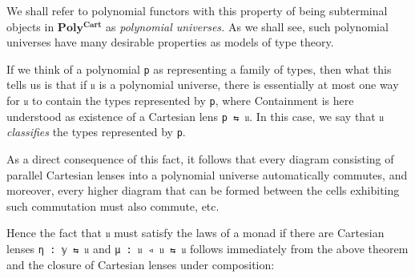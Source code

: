 \documentclass[
  11pt,
  oneside,
  article]{memoir}
\theoremstyle{definition}
\theoremstyle{plain}
\newcommand{\0}{\textsf{0}}
\newcommand{\1}{\tn{\textsf{1}}}
\begin{document}
We shall refer to polynomial functors with this property of being
subterminal objects in \(\mathbf{Poly^{Cart}}\) as \emph{polynomial
universes.} As we shall see, such polynomial universes have many
desirable properties as models of type theory.

If we think of a polynomial \texttt{p} as representing a family of
types, then what this tells us is that if \texttt{𝔲} is a polynomial
universe, there is essentially at most one way for \texttt{𝔲} to contain
the types represented by \texttt{p}, where Containment is here
understood as existence of a Cartesian lens \texttt{p\ ⇆\ 𝔲}. In this
case, we say that \texttt{𝔲} \emph{classifies} the types represented by
\texttt{p}.

As a direct consequence of this fact, it follows that every diagram
consisting of parallel Cartesian lenses into a polynomial universe
automatically commutes, and moreover, every higher diagram that can be
formed between the cells exhibiting such commutation must also commute,
etc.

Hence the fact that \texttt{𝔲} must satisfy the laws of a monad if there
are Cartesian lenses \texttt{η\ :\ 𝕪\ ⇆\ 𝔲} and
\texttt{μ\ :\ 𝔲\ ◃\ 𝔲\ ⇆\ 𝔲} follows immediately from the above theorem
and the closure of Cartesian lenses under composition:
\end{document}
